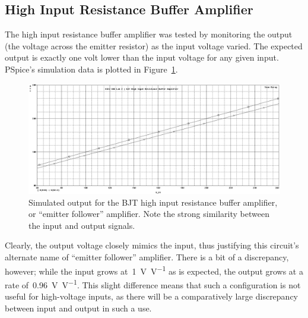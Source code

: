 \subsection{High Input Resistance Buffer Amplifier}
The high input resistance buffer amplifier was tested by monitoring the output
(the voltage across the emitter resistor) as the input voltage varied.  The
expected output is exactly one volt lower than the input voltage for any given
input.  PSpice's simulation data is plotted in Figure~\ref{fig:bjtPlotV}.
%
\begin{figure}[H]
	\centering
	\includegraphics[width=\pwidth]{img/plot/bjtPlotV.PNG}
	\parbox{\pwidth}{
	\caption[PSpice Plot --- Buffer Amplifier (Voltage)]{Simulated output for
		the BJT high input resistance buffer amplifier, or ``emitter follower''
		amplifier.  Note the strong similarity between the input and output
		signals.}
	\label{fig:bjtPlotV}}
\end{figure}
%
Clearly, the output voltage closely mimics the input, thus justifying this
circuit's alternate name of ``emitter follower'' amplifier.  There is a bit of
a discrepancy, however; while the input grows at~\SI{1}{\volt\per\volt} as is
expected, the output grows at a rate of~\SI{0.96}{\volt\per\volt}.  This slight
difference means that such a configuration is not useful for high-voltage
inputs, as there will be a comparatively large discrepancy between input and
output in such a use.

